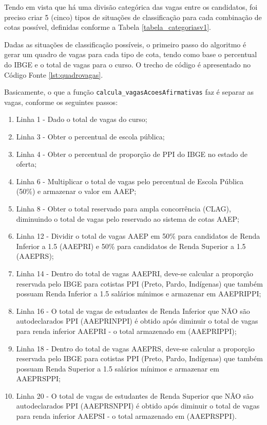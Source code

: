Tendo em vista que há uma divisão categórica das vagas entre os candidatos, foi preciso criar 5 (cinco) tipos de situações de classificação para cada combinação de cotas possível, definidas conforme a Tabela \ref{tabela_categoriasv1}.



\newpage
Dadas as situações de classificação possíveis, o primeiro passo do algoritmo é gerar um quadro de vagas para cada tipo de cota, tendo como base o percentual do \gls{IBGE} e o total de vagas para o curso. O trecho de código é apresentado no Código Fonte \ref{lst:quadrovagas}.




Basicamente, o que a função \texttt{calcula\_vagasAcoesAfirmativas} faz é separar as vagas, conforme os seguintes passos:

\begin{enumerate}
    \item Linha 1 - Dado o total de vagas do curso;
    \item Linha 3 - Obter o percentual de escola pública;
    \item Linha 4 - Obter o percentual de proporção de PPI do IBGE no estado de oferta;
    \item Linha 6 - Multiplicar o total de vagas pelo percentual de Escola Pública (50\%) e armazenar o valor em AAEP;
    \item Linha 8 - Obter o total reservado para ampla concorrência (CLAG), diminuindo o total de vagas pelo reservado ao sistema de cotas AAEP;
    \item Linha 12 - Dividir o total de vagas AAEP em 50\% para candidatos de Renda Inferior a 1.5 (AAEPRI) e 50\% para candidatos de Renda Superior a 1.5 (AAEPRS);
    \item Linha 14 - Dentro do total de vagas AAEPRI, deve-se calcular a proporção reservada pelo IBGE para cotistas PPI (Preto, Pardo, Indígenas) que também possuam Renda Inferior a 1.5 salários mínimos e armazenar em AAEPRIPPI;
    \item Linha 16 - O total de vagas de estudantes de Renda Inferior que NÃO são autodeclarados PPI (AAEPRINPPI) é obtido após diminuir o total de vagas para renda inferior AAEPRI - o total armazenado em (AAEPRIPPI);
    
    \item Linha 18 - Dentro do total de vagas AAEPRS, deve-se calcular a proporção reservada pelo IBGE para cotistas PPI (Preto, Pardo, Indígenas) que também possuam Renda Superior a 1.5 salários mínimos e armazenar em AAEPRSPPI;
    \item Linha 20 - O total de vagas de estudantes de Renda Superior que NÃO são autodeclarados PPI (AAEPRSNPPI) é obtido após diminuir o total de vagas para renda inferior AAEPSI - o total armazenado em (AAEPRSPPI).
\end{enumerate}{}

